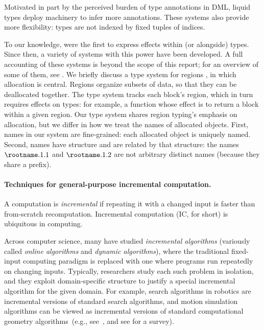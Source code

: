 \documentclass{purple}
\begin{document}
Motivated in part by the perceived burden of type annotations in DML,
liquid types \citep{Rondon08,Vazou13} deploy machinery to infer
more annotations.  These systems also provide more flexibility:
types are not indexed by fixed tuples of indices.


To our knowledge, \citet{Gifford86} were the first to express effects within (or alongside) types.
Since then, a variety of systems with this power have been developed.
A full accounting of these systems is beyond the scope of this report;
for an overview of some of them, see \citet{Henglein05:ATTAPL-Chapter}.
We briefly discuss a type system for regions \citep{Tofte97},
in which allocation is central.
Regions organize subsets of data, so that they can be deallocated together.
The type system tracks each block's region, which in turn requires effects on types:
for example, a function whose effect is to return a block within a given region.
Our type system shares region typing's emphasis on allocation,
but we differ in how we treat the names of allocated objects.
First, names in our system are fine-grained: each allocated object is uniquely named.
Second, names have structure and are related by that structure:
the names $\rootname.1.1$ and $\rootname.1.2$ are not arbitrary distinct names
(because they share a prefix).


\paragraph{Techniques for general-purpose incremental computation.}
%
A computation is \emph{incremental} if repeating it with a changed input is
faster than from-scratch recomputation.
%
Incremental computation (IC, for short) is ubiquitous in computing.

Across computer science, many have studied \emph{incremental
  algorithms} (variously called \emph{online algorithms} and
\emph{dynamic algorithms}), where the traditional fixed-input
computing paradigm is replaced with one where programs run repeatedly
on changing inputs.
%
Typically, researchers study each such problem in isolation, and they
exploit domain-specific structure to justify a special incremental
algorithm for the given domain.
%
For example, search algorithms in
robotics are incremental versions of standard search
algorithms,
and motion simulation algorithms can be
viewed as incremental versions of standard computational
geometry algorithms~(e.g.,
see~\cite{AgarwalBaBeGuHe99,AgarwalGuHeVe01,AlexandronKaSh05,Basch99,BaschErGuHeZh04},
and see \cite{motion-survey02} for a survey).
\end{document}

